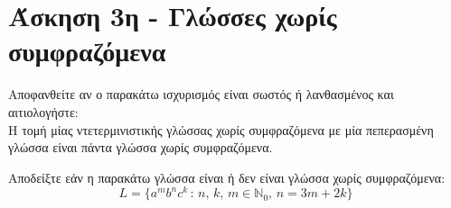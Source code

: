 \section{Άσκηση 3η - Γλώσσες χωρίς συμφραζόμενα}
\label{sec:Exercise_3}
\doublespacing

\bm{\textcolor{blue}{(α) [5\%]}} Αποφανθείτε αν ο παρακάτω ισχυρισμός είναι σωστός ή λανθασμένος και αιτιολογήστε:\\
Η τομή μίας ντετερμινιστικής γλώσσας χωρίς συμφραζόμενα με μία πεπερασμένη γλώσσα είναι πάντα γλώσσα χωρίς
συμφραζόμενα.

\bm{\textcolor{blue}{(β) [5\%]}} Αποδείξτε εάν η παρακάτω γλώσσα είναι ή δεν είναι γλώσσα χωρίς συμφραζόμενα:\\
\[L = \{a^mb^nc^k\,:\,n,\,k,\,m\in\mathbb{N}_0,\, n=3m+2k\}\]




\hfill \break


\clearpage